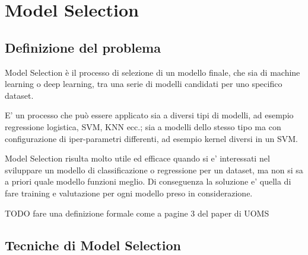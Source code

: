 \chapter{Model Selection}

\section{Definizione del problema}
Model Selection è il processo di selezione di un modello finale, che sia di machine learning o deep learning, tra una serie di modelli candidati per uno specifico dataset.

E' un processo che può essere applicato sia a diversi tipi di modelli, ad esempio regressione logistica, SVM, KNN ecc.; sia a modelli dello stesso tipo ma con configurazione di iper-parametri differenti, ad esempio kernel diversi in un SVM.

Model Selection risulta molto utile ed efficace quando si e' interessati nel sviluppare un modello di classificazione o regressione per un dataset, ma non si sa a priori quale modello funzioni meglio. Di conseguenza la soluzione e' quella di fare training e valutazione per ogni modello preso in considerazione.

TODO fare una definizione formale come a pagine 3 del paper di UOMS

\section{Tecniche di Model Selection}
